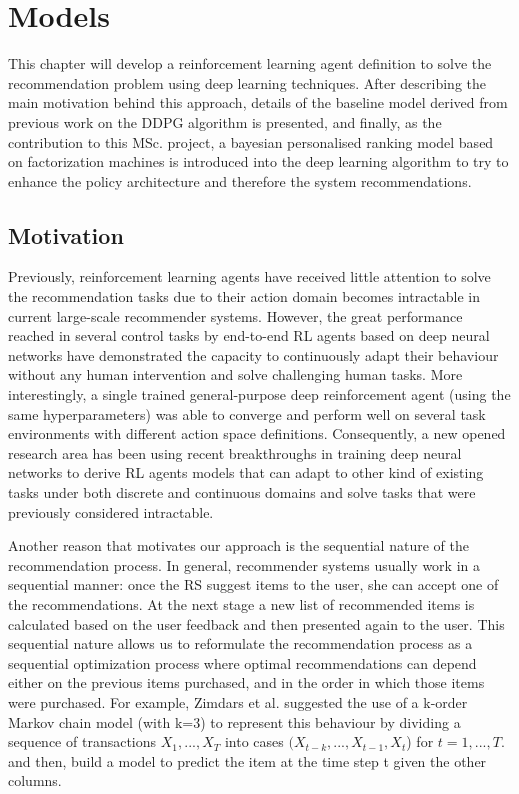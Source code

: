 \chapter{Models}
\label{sec:chapterlabel3}

This chapter will develop a reinforcement learning agent definition to solve the recommendation problem using deep learning techniques. After describing the main motivation behind this approach, details of the baseline model derived from previous work on the DDPG algorithm is presented, and finally, as the contribution to this MSc. project, a bayesian personalised ranking model based on factorization machines is introduced into the deep learning algorithm to try to enhance the policy architecture and therefore the system recommendations.

\section{Motivation}

Previously, reinforcement learning agents have received little attention to solve the recommendation tasks due to their action domain becomes intractable in current large-scale recommender systems. However, the great performance reached in several control tasks by end-to-end RL agents based on deep neural networks\cite{mnih2015human} have demonstrated the capacity to continuously adapt their behaviour without any human intervention and solve challenging human tasks. More interestingly, a single trained general-purpose deep reinforcement agent (using the same hyperparameters) was able to converge and perform well on several task environments with different action space definitions. Consequently, a new opened research area has been using recent breakthroughs in training deep neural networks to derive RL agents models that can adapt to other kind of existing tasks under both discrete and continuous domains and solve tasks that were previously considered intractable.

Another reason that motivates our approach is the sequential nature of the recommendation process. In general, recommender systems usually work in a sequential manner: once the RS suggest items to the user, she can accept one of the recommendations. At the next stage a new list of recommended items is calculated based on the user feedback and then presented again to the user. This sequential nature allows us to reformulate the recommendation process as a sequential optimization process where optimal recommendations can depend either on the previous items purchased, and in the order in which those items were purchased. For example, Zimdars et al. \cite{zimdars2001using} suggested the use of a k-order Markov chain model (with k=3) to represent this behaviour by dividing a sequence of transactions $X_1, . . . ,X_T$ into cases $(X_{t-k}, . . . ,X_{t-1},X_t$) for $t = 1, . . . ,T$. and then, build a model to predict the item at the time step t given the other columns. 


